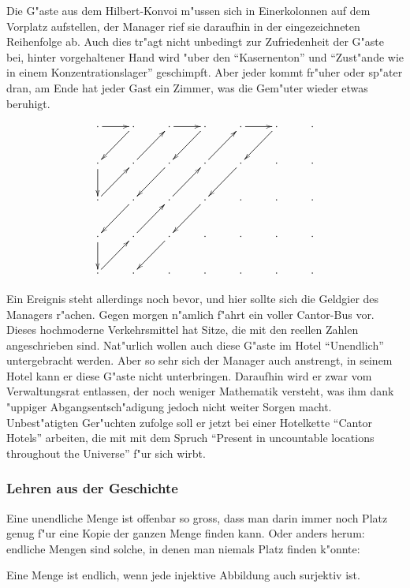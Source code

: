 Die G"aste aus dem Hilbert-Konvoi m"ussen sich in Einerkolonnen auf
dem Vorplatz aufstellen, der Manager rief sie daraufhin in der
eingezeichneten Reihenfolge ab. Auch dies tr"agt nicht  unbedingt
zur Zufriedenheit der G"aste bei, hinter vorgehaltener Hand wird
"uber den ``Kasernenton'' und ``Zust"ande wie in einem Konzentrationslager''
geschimpft.
Aber jeder kommt fr"uher oder sp"ater dran,
am Ende hat jeder Gast ein Zimmer, was die Gem"uter wieder
etwas beruhigt.

\[
\xymatrix{
\ar[r]
\cdot	     &\cdot\ar[dl] &\cdot\ar[r] &\cdot\ar[dl]  &\cdot\ar[r] &\cdot\ar[dl] &\cdot
\\
\cdot\ar[d]  &\cdot\ar[ur] &\cdot\ar[dl] &\cdot\ar[ur] &\cdot\ar[dl]&\cdot        &\cdot
\\
\cdot\ar[ur] &\cdot\ar[dl] &\cdot\ar[ur] &\cdot\ar[dl] &\cdot       &\cdot        &\cdot
\\
\cdot\ar[d]  &\cdot\ar[ur] &\cdot\ar[dl] &\cdot        &\cdot       &\cdot        &\cdot
\\
\cdot\ar[ur] &\cdot        &\cdot        &\cdot        &\cdot       &\cdot        &\cdot
}
\]

Ein Ereignis steht allerdings noch bevor, und hier sollte sich die
Geldgier des Managers r"achen. Gegen morgen n"amlich f"ahrt
ein voller Cantor-Bus vor. Dieses hochmoderne Verkehrsmittel hat Sitze,
die mit den reellen Zahlen angeschrieben sind. Nat"urlich wollen auch
diese G"aste im Hotel ``Unendlich'' untergebracht werden. Aber so sehr
sich der Manager auch anstrengt, in seinem Hotel kann er diese
G"aste nicht unterbringen. Daraufhin wird er zwar vom Verwaltungsrat
entlassen, der noch weniger Mathematik versteht, was ihm dank "uppiger
Abgangsentsch"adigung jedoch nicht weiter Sorgen macht. Unbest"atigten
Ger"uchten zufolge soll er jetzt bei einer Hotelkette ``Cantor Hotels''
arbeiten, die mit mit dem Spruch ``Present in uncountable locations
throughout the Universe'' f"ur sich wirbt.

\subsubsection{Lehren aus der Geschichte}
Eine unendliche Menge ist offenbar so gross, dass man darin immer noch
Platz genug f"ur eine Kopie der ganzen Menge finden kann. Oder anders
herum: endliche Mengen sind solche, in denen man niemals Platz finden
k"onnte:

\begin{satz}
Eine Menge ist endlich, wenn jede injektive Abbildung auch surjektiv ist.
\end{satz}


